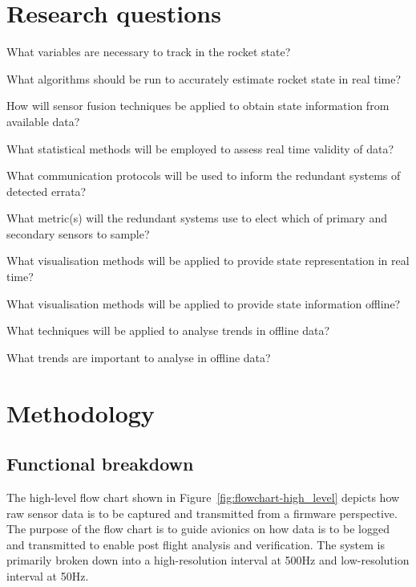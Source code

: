 \section{Research questions}
\begin{questions}
  \item What variables are necessary to track in the rocket state?
  \item What algorithms should be run to accurately estimate rocket state in real time?
  \item How will sensor fusion techniques be applied to obtain state information from available data?
  \item What statistical methods will be employed to assess real time validity of data? \begin{questions}
    \item What communication protocols will be used to inform the redundant systems of detected errata?
    \item What metric(s) will the redundant systems use to elect which of primary and secondary sensors to sample?
  \end{questions}
  \item What visualisation methods will be applied to provide state representation in real time?
  \item What visualisation methods will be applied to provide state information offline? \begin{questions}
    \item What techniques will be applied to analyse trends in offline data? 
    \item What trends are important to analyse in offline data?
  \end{questions}
\end{questions}

\section{Methodology}
\subsection{Functional breakdown}
The high-level flow chart shown in Figure~\ref{fig:flowchart-high_level} depicts how raw sensor data is to be captured and transmitted from a firmware perspective.  The purpose of the flow chart is to guide avionics on how data is to be logged and transmitted to enable post flight analysis and verification. The system is primarily broken down into a high-resolution interval at 500Hz and low-resolution interval at 50Hz. 

